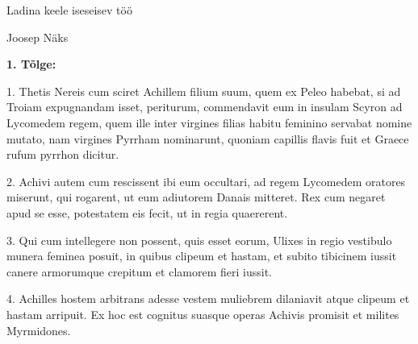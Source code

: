 \documentclass[12pt]{article}
\newenvironment{tiitel}
	{\begin{center}
	\bfseries
	\large
	}{
	\end{center}
	}
\newcommand{\cm}[1]{\ignorespaces}
\begin{document}
\begin{tiitel}
Ladina keele iseseisev töö
\end{tiitel}
\begin{center}
Joosep Näks
\end{center}

\textbf{1. Tõlge:}\\
\begin{minipage}[t]{.5\textwidth}
\raggedright
1. Thetis \cm{Thetis - merejumalanna} Nereis \cm{Nereis - Nereiid, pmst nümf} cum sciret \cm{3. pööre imperf act konj, teadma} Achillem filium suum, quem ex Peleo \cm{Peleus - Tassaalia kuningas, abl vormis} habebat\cm{3. pööre imperf ind, omama}, si ad Troiam expugnandam \cm{acc fut pass part sõnast expugno ehk ründama, vallutama} isset\cm{3. pööre plusquam perf konj eo, minema}, periturum, commendavit \cm{3. perf, usaldama} eum in insulam Scyron ad Lycomedem regem, quem ille inter virgines filias habitu \cm{harjumus abl} feminino \cm{naiselik abl} servabat \cm{imperf ind päästma, kaitsma} nomine \cm{abl} mutato\cm{dat/abl s perf pass part muutma}, nam virgines Pyrrham nominarunt\cm{3.pl perf}, quoniam capillis \cm{dat/abl juuksed} flavis \cm{dat/abl blond} fuit \cm{3.s perf sum} et Graece rufum pyrrhon dicitur\cm{3.s pass}.\newline

2. Achivi autem cum rescissent \cm{plusquam perf konj, teada saama} ibi eum occultari\cm{pass inf peitma}, ad regem Lycomedem oratores \cm{nom/acc/voc pl kõneleja} miserunt\cm{3. pööre pl perf saatma, viskama}, qui rogarent\cm{3.pl imperf konj küsima}, ut eum adiutorem Danais \cm{dat/abl danaoslased} mitteret\cm{3.s imperf konj saatma}. Rex cum negaret \cm{3.s imperf konj tagasi lükkama} apud se esse, potestatem \cm{acc võim} eis fecit\cm{3.s perf tegema}, ut in regia \cm{abl palee} quaererent\cm{3.pl imperf konj otsima}.\newline

3. Qui cum intellegere \cm{inf aru saama} non possent\cm{3.pl imperf konj}, quis esset \cm{3.s imperf konj olema} eorum, Ulixes \cm{Ulixes - Odüsseus} in regio vestibulo munera feminea posuit\cm{3.s perf panema, asetama}, in quibus clipeum et hastam, et subito tibicinem iussit \cm{3.s perf} canere armorumque crepitum et clamorem fieri \cm{inf fio - tekkima, juhtuma / pass inf facio - tegema, sooritama} iussit.\newline

4. Achilles hostem arbitrans \cm{pres part} adesse \cm{inf} vestem muliebrem dilaniavit \cm{3.s perf} atque clipeum et hastam arripuit\cm{3.pl perf}. Ex hoc est cognitus \cm{perf pass part} suasque operas Achivis promisit \cm{3.s perf} et milites Myrmidones.
\end{minipage}%
\end{document}
